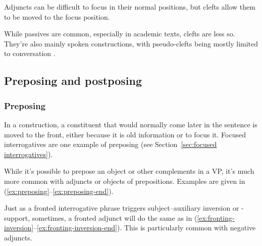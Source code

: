 Adjuncts can be difficult to focus in their normal positions, but clefts allow them to be moved to the focus position.

\ea\label{ex:adjuct-focus}
    \z
\ex\label{ex:adjunct-focus2}
    \z
\z
While passives are common, especially in academic texts, clefts are less so. They're also mainly spoken constructions, with pseudo-clefts being mostly limited to conversation \citep[938]{Biber1999}.

\subsection{Preposing and postposing}

\subsubsection*{Preposing}\label{sec:preposing}

In a  construction, a constituent that would normally come later in the sentence is moved to the front, either because it is old information or to focus it. Focused interrogatives are one example of preposing (see Section~\ref{sec:focused interrogatives}). 

While it's possible to prepose an object or other complements in a VP, it's much more common with adjuncts or objects of prepositions. Examples are given in (\ref{ex:preposing}--\ref{ex:preposing-end}).

\ea \label{ex:preposing}
    \z
\ex 
    \z
\ex
    \z
\ex \label{ex:preposing-end}
    \z
\ex 
    \z
\ex 
    \z
\z
Just as a fronted interrogative phrase triggers subject--auxiliary inversion or -support, sometimes, a fronted adjunct will do the same as in (\ref{ex:fronting-inversion}--\ref{ex:fronting-inversion-end}). This is particularly common with negative adjuncts.


